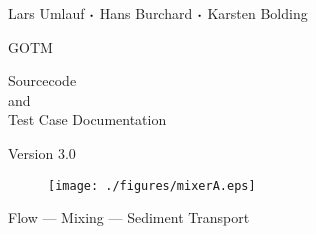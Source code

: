 \documentclass[letter,twoside]{article}
\begin{document}
\begin{titlepage}


{\sf \bf \LARGE
 \begin{center}
   Lars Umlauf ${\boldsymbol \cdot}$ Hans Burchard ${\boldsymbol \cdot}$ Karsten Bolding
 \end{center}
}

\vspace{14mm}

{\sf \bf \Huge
 \begin{center}
   GOTM
 \end{center}
}

\vspace{6mm}

{\sf \bf \LARGE
 \begin{center}
   Sourcecode \\
      and \\
Test Case Documentation
 \end{center}
}


\vspace{5mm}

{\sf \bf \Large
 \begin{center}
  Version 3.0
 \end{center}
}

\vspace{8mm}

\begin{figure}[!h]
  \begin{center}
  \texttt{[image: ./figures/mixerA.eps]}
  \end{center}
\end{figure}

\vspace{7mm}

{\sf \bf \Large
 \begin{center}
  Flow ---  Mixing --- Sediment Transport
\end{center}
}


\end{titlepage}


\cleardoublepage
\tableofcontents


\cleardoublepage



\cleardoublepage



\cleardoublepage


\end{document}
